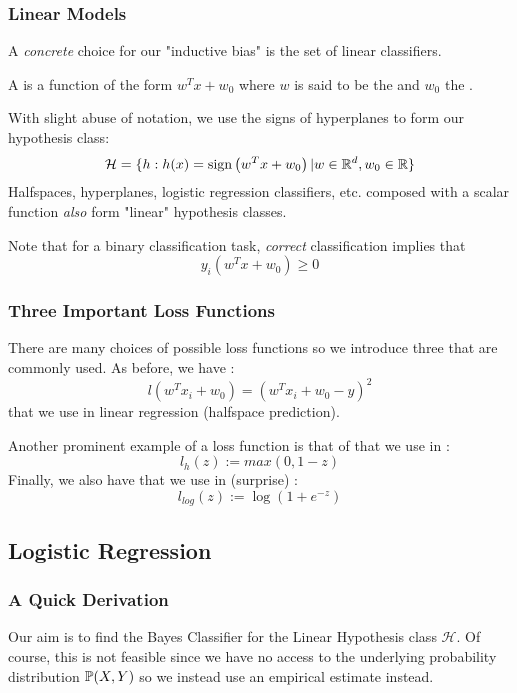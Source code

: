 \documentclass[11pt]{scrartcl}
\begin{document}
\subsubsection{Linear Models}
A \textit{concrete} choice for our "inductive bias" is the set of linear classifiers. 
\begin{defn}
A  is a function of the form $w^{T}x+w_0$ where $w$ is said to be the  and $w_0$ the .
\end{defn}
With slight abuse of notation, we use the signs of hyperplanes to form our hypothesis class:
$$\mathcal{H}=\{h: h(x) = \text{sign}\left(w^{T}x+w_0\right) | w \in\mathbb{R}^d, w_0 \in \mathbb{R}\}$$
Halfspaces, hyperplanes, logistic regression classifiers, etc. composed with a scalar function \textit{also} form "linear" hypothesis classes. 

Note that for a binary classification task, \textit{correct} classification implies that $$y_i(w^{T}x+w_0) \ge 0$$

\subsubsection{Three Important Loss Functions}
There are many choices of possible loss functions so we introduce three that are commonly used. As before, we have :
$$l(w^{T}x_i+w_0)=(w^{T}x_i+w_0-y)^2$$
that we use in linear regression (halfspace prediction). 

Another prominent example of a loss function is that of  that we use in : $$l_h(z) := max(0,1-z)$$ 
Finally, we also have  that we use in (surprise) :
$$l_{log}(z) := \log(1+e^{-z})$$

\subsection{Logistic Regression}
\subsubsection{A Quick Derivation}
Our aim is to find the Bayes Classifier for the Linear Hypothesis class $\mathcal{H}$. Of course, this is not feasible since we have no access to the underlying probability distribution $\mathbb{P}(X,Y)$ so we instead use an empirical estimate instead. 
\end{document}
